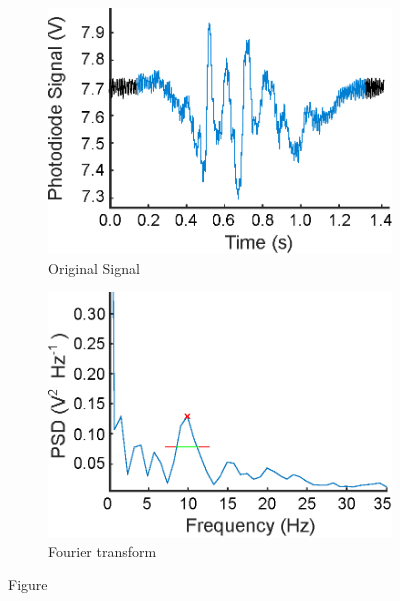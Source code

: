 \documentclass{physics_article_B}
\begin{document}
         \begin{figure}[H]
            \centering   
            \begin{subfigure}[b]{0.48\textwidth}
                \hspace*{0cm}\includegraphics[width=\textwidth]{Figures/PingSignal.eps}
                \caption{Original Signal}
                \label{fig:oscillation:signal}
            \end{subfigure}\hspace{3pt}
            \begin{subfigure}[b]{0.48\textwidth}
                \hspace*{0.1cm}\includegraphics[width=\textwidth]{Figures/PingPD.eps} 
                \caption{Fourier transform}
                \label{fig:oscillation:FT}
                \end{subfigure}
            \caption{Figure }\label{fig:oscillation}
        \end{figure} 
        
\end{document}
